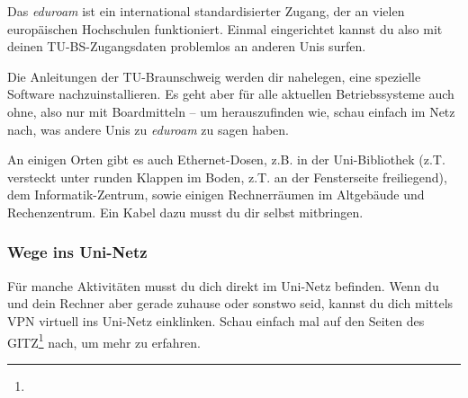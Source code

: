 		Das \emph{eduroam} ist ein international standardisierter Zugang, der an vielen europäischen Hochschulen funktioniert. Einmal eingerichtet kannst du also mit deinen TU-BS-Zugangsdaten problemlos an anderen Unis surfen.

		Die Anleitungen der TU-Braunschweig werden dir nahelegen, eine spezielle Software nachzuinstallieren. Es geht aber für alle aktuellen Betriebssysteme auch ohne, also nur mit Boardmitteln -- um herauszufinden wie, schau einfach im Netz nach, was andere Unis zu \emph{eduroam} zu sagen haben.

		An einigen Orten gibt es auch Ethernet-Dosen, z.B. in der Uni-Bibliothek (z.T. versteckt unter runden Klappen im Boden, z.T. an der Fensterseite freiliegend), dem Informatik-Zentrum, sowie einigen Rechnerräumen im Altgebäude und Rechenzentrum. Ein Kabel dazu musst du dir selbst mitbringen.

    \subsubsection{Wege ins Uni-Netz}
        Für manche Aktivitäten musst du dich direkt im Uni-Netz befinden. Wenn du und dein Rechner aber gerade zuhause oder sonstwo seid, kannst du dich mittels VPN virtuell ins Uni-Netz einklinken. Schau einfach mal auf den Seiten des GITZ\footnote{} nach, um mehr zu erfahren.
